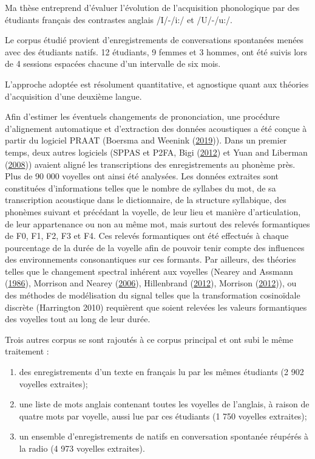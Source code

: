 \documentclass[
  10pt,
]{article}
\begin{document}
Ma thèse entreprend d'évaluer l'évolution de l'acquisition phonologique par des étudiants français
des contrastes anglais /I/-/i:/ et /U/-/u:/.

Le corpus étudié provient d'enregistrements de conversations spontanées menées avec des étudiants natifs. 12 étudiants, 9 femmes et 3 hommes, ont été suivis lors de 4 sessions espacées
chacune d'un intervalle de six mois.

L'approche adoptée est résolument quantitative, et agnostique quant aux théories d'acquisition
d'une deuxième langue.

Afin d'estimer les éventuels changements de prononciation, une procédure d'alignement automatique et d'extraction des données acoustiques a été conçue à partir du logiciel PRAAT (Boersma and Weenink (\protect\hyperlink{ref-praat}{2019})). Dans un premier temps, deux autres logiciels (SPPAS et P2FA, Bigi (\protect\hyperlink{ref-sppas2012}{2012}) et Yuan and Liberman (\protect\hyperlink{ref-p2fa}{2008})) avaient aligné les transcriptions des enregistrements au phonème près. Plus de 90 000
voyelles ont ainsi été analysées. Les données extraites sont constituées d'informations telles que
le nombre de syllabes du mot, de sa transcription acoustique dans le dictionnaire, de la structure
syllabique, des phonèmes suivant et précédant la voyelle, de leur lieu et manière d'articulation, de
leur appartenance ou non au même mot, mais surtout des relevés formantiques de F0, F1, F2, F3
et F4. Ces relevés formantiques ont été effectués à chaque pourcentage de la durée de la voyelle
afin de pouvoir tenir compte des influences des environnements consonantiques sur ces formants.
Par ailleurs, des théories telles que le changement spectral inhérent aux voyelles (Nearey and Assmann (\protect\hyperlink{ref-nearey1986}{1986}), Morrison and Nearey (\protect\hyperlink{ref-morrison2006}{2006}), Hillenbrand (\protect\hyperlink{ref-hillenbrand2012}{2012}), Morrison (\protect\hyperlink{ref-morrison2012}{2012})), ou des méthodes
de modélisation du signal telles que la transformation cosinoïdale discrète (Harrington 2010) requièrent que soient relevées les valeurs formantiques des voyelles tout au long de leur durée.

Trois autres corpus se sont rajoutés à ce corpus principal et ont subi le même traitement :

\begin{enumerate}
\def\labelenumi{\arabic{enumi}.}
\item
  des enregistrements d'un texte en français lu par les mêmes étudiants (2 902 voyelles extraites);
\item
  une liste de mots anglais contenant toutes les voyelles de l'anglais, à raison de quatre mots
  par voyelle, aussi lue par ces étudiants (1 750 voyelles extraites);
\item
  un ensemble d'enregistrements de natifs en conversation spontanée réupérés à la radio
  (4 973 voyelles extraites).
\end{enumerate}
\end{document}
